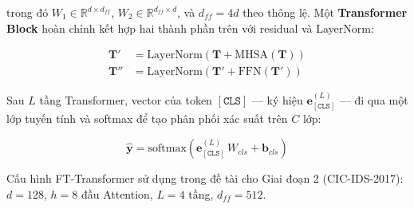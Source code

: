 \documentclass[../DoAn.tex]{subfiles}
\begin{document}
trong đó $W_1 \in \mathbb{R}^{d \times d_{ff}}$, $W_2 \in \mathbb{R}^{d_{ff} \times d}$, và $d_{ff} = 4d$ theo thông lệ. Một \textbf{Transformer Block} hoàn chỉnh kết hợp hai thành phần trên với residual và LayerNorm:

\begin{align}
    \mathbf{T}' &= \text{LayerNorm}(\mathbf{T} + \text{MHSA}(\mathbf{T}))   \label{eq:block1} \\
    \mathbf{T}'' &= \text{LayerNorm}(\mathbf{T}' + \text{FFN}(\mathbf{T}')) \label{eq:block2}
\end{align}

Sau $L$ tầng Transformer, vector của token $[\texttt{CLS}]$ --- ký hiệu $\mathbf{e}_{[\texttt{CLS}]}^{(L)}$ --- đi qua một lớp tuyến tính và softmax để tạo phân phối xác suất trên $C$ lớp:

\begin{equation}
    \hat{\mathbf{y}} = \text{softmax}\!\left(\mathbf{e}_{[\texttt{CLS}]}^{(L)}\, W_{cls} + \mathbf{b}_{cls}\right)
    \label{eq:cls-head}
\end{equation}

Cấu hình FT-Transformer sử dụng trong đề tài cho Giai đoạn 2 (CIC-IDS-2017): $d = 128$, $h = 8$ đầu Attention, $L = 4$ tầng, $d_{ff} = 512$.
\end{document}

